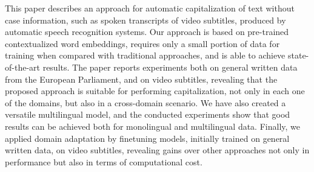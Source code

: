  
This paper describes an approach for automatic capitalization of text without case information, such as spoken transcripts of video subtitles, produced by automatic speech recognition systems. Our approach is based on pre-trained contextualized word embeddings, requires only a small portion of data for training when compared with traditional approaches, and is able to achieve state-of-the-art results. The paper reports experiments both on general written data from the European Parliament, and on video subtitles, revealing that the proposed approach is suitable for performing capitalization, not only in each one of the domains, but also in a cross-domain scenario. We have also created a versatile multilingual model, and the conducted experiments show that good results can be achieved both for monolingual and multilingual data. Finally, we applied domain adaptation by finetuning models, initially trained on general written data, on video subtitles, revealing gains over other approaches not only in performance but also in terms of computational cost.


